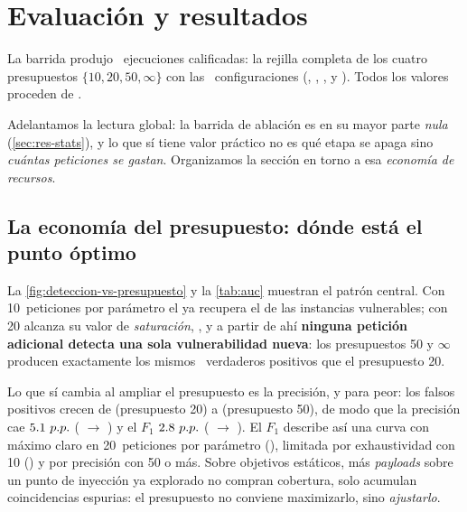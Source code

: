 
\section{Evaluación y resultados}
\label{sec:resultados}

La barrida produjo \NumCorridas{}~ejecuciones calificadas: la rejilla completa
de los cuatro presupuestos $\{10, 20, 50, \infty\}$ con las
\NumCondiciones{}~configuraciones (, ,
,  y ).
Todos los valores proceden de .

Adelantamos la lectura global: la barrida de ablación es en su mayor parte
\emph{nula} (\cref{sec:res-stats}), y lo que sí tiene valor práctico no es qué
etapa se apaga sino \emph{cuántas peticiones se gastan}. Organizamos la sección
en torno a esa \emph{economía de recursos}.

\subsection{La economía del presupuesto: dónde está el punto óptimo}
\label{sec:res-eficiencia}

La \cref{fig:deteccion-vs-presupuesto} y la \cref{tab:auc} muestran el patrón
central. Con \num{10}~peticiones por parámetro el  ya recupera
el \ValorRecallBDiez{} de las instancias vulnerables; con \num{20} alcanza su
valor de \emph{saturación}, \ValorRecallTecho{}, y a partir de ahí
\textbf{ninguna petición adicional detecta una sola vulnerabilidad nueva}:
los presupuestos \num{50} y $\infty$ producen exactamente los mismos
\ValorTPtecho{}~verdaderos positivos que el presupuesto \num{20}.

Lo que sí cambia al ampliar el presupuesto es la precisión, y para peor: los
falsos positivos crecen de \ValorFPBVeinte{} (presupuesto \num{20}) a
\ValorFPBCincuenta{} (presupuesto \num{50}), de modo que la precisión cae
$\num{5.1}~p.p.{}$ (\ValorPrecisionBVeinte{} $\to$
\ValorPrecisionBCincuenta{}) y el $F_1$ $\num{2.8}~p.p.{}$
(\ValorFOneBVeinte{} $\to$ \ValorFOneBCincuenta{}). El $F_1$ describe así una
curva con máximo claro en \num{20}~peticiones por parámetro
(\ValorFOneBVeinte{}), limitada por exhaustividad con \num{10}
(\ValorFOneBDiez{}) y por precisión con \num{50} o más. Sobre objetivos
estáticos, más \emph{payloads} sobre un punto de inyección ya explorado no
compran cobertura, solo acumulan coincidencias espurias: el presupuesto no
conviene maximizarlo, sino \emph{ajustarlo}.

